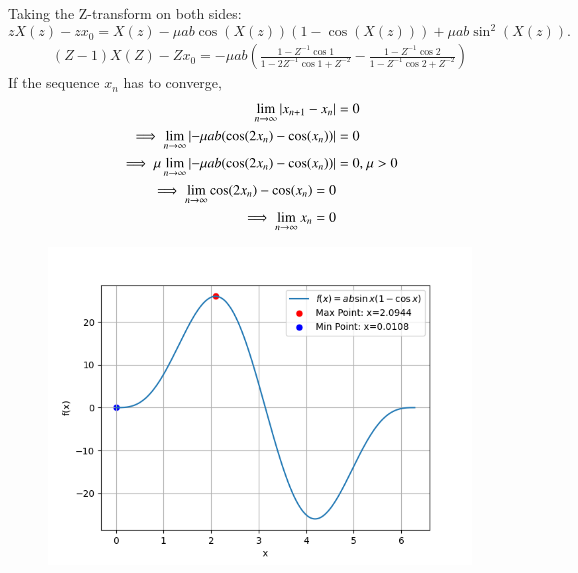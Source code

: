 \documentclass[journal]{IEEEtran}
\begin{document}
	Taking the Z-transform on both sides:
	\[
	zX(z) - zx_0 = X(z) - \mu ab \cos(X(z))(1 - \cos(X(z))) + \mu ab \sin^2(X(z)).
	\]
	\begin{align}
		(Z-1)X(Z)-Zx_{0}=-{\mu}ab\left(\frac{1-Z^{-1}\cos{1}}{1-2Z^{-1}\cos{1}+Z^{-2}}-\frac{1-Z^{-1}\cos{2}}{1-Z^{-1}\cos{2}+Z^{-2}}\right)
	\end{align}
	If the sequence $x_n$ has to converge,
	\begin{align}
		\lim_{n\to\infty} \left\vert x_{n + 1} - x_n\right\vert &= 0\\
		\implies \lim_{n\to\infty} \left\vert-{\mu}ab(\cos(2x_{n})-\cos(x_{n}))\right\vert &= 0\\
		\implies \mu \lim_{n\to\infty} \left\vert-{\mu}ab(\cos(2x_{n})-\cos(x_{n}))\right\vert &= 0 \text{, } \mu > 0\\
		\implies \lim_{n\to\infty} \cos(2x_{n})-\cos(x_{n}) = 0\\
		\implies \lim_{n\to\infty} x_{n} = 0
	\end{align}
	\begin{figure}[h!]
		\centering
		\includegraphics[width=0.7\columnwidth]{figs/Fig1.png}
		\label{label}
	\end{figure}
	
\end{document}
